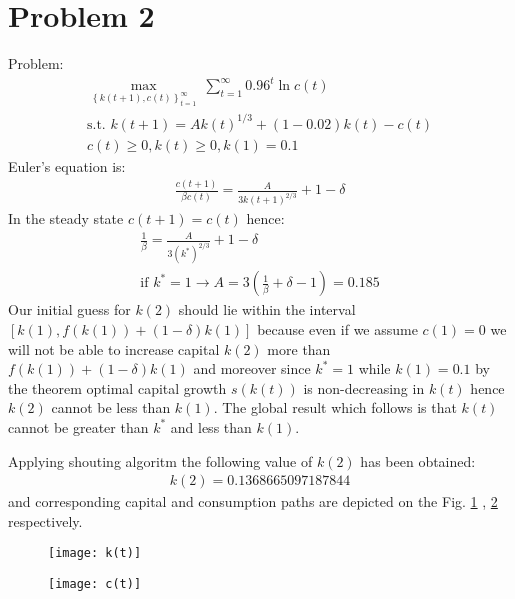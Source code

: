 \documentclass[a4paper]{article}
\begin{document}
\section*{Problem 2}
Problem:
\begin{align*}
\underset{\left\{k(t+1), c(t)\right\}_{t=1}^{\infty}}{\max}\ \sum_{t=1}^{\infty} 0.96^t \ln c(t)\\
\text{s.t.\ } k(t+1) = Ak(t)^{1/3} + (1-0.02)k(t) - c(t)\\
c(t) \ge 0, k(t) \ge 0, k(1) = 0.1
\end{align*}
Euler's equation is:
\begin{align*}
\frac{c(t+1)}{\beta c(t)} = \frac{A}{3k(t+1)^{2/3}} + 1 - \delta
\end{align*}
In the steady state $c(t+1) = c(t)$ hence:
\begin{align*}
\frac{1}{\beta} = \frac{A}{3(k^*)^{2/3}} + 1 - \delta\\
\text{if } k^* = 1 \to A = 3(\frac{1}{\beta} + \delta - 1) = 0.185
\end{align*}
Our initial guess for $k(2)$ should lie within the interval $ [k(1), f(k(1)) + (1 - \delta)k(1)]$ because even if we assume $c(1) = 0$ we will not be able to increase capital $k(2)$ more than $f(k(1)) + (1 - \delta)k(1)$ and moreover since $k^* = 1$ while $k(1) = 0.1$ by the theorem optimal capital growth $s(k(t))$ is non-decreasing in $k(t)$ hence $k(2)$ cannot be less than $k(1)$. The global result which follows is that $k(t)$ cannot be greater than $k^*$ and less than $k(1)$.



Applying shouting algoritm the following value of $k(2)$ has been obtained:
\begin{align*}
k(2) = 0.1368665097187844
\end{align*}
and corresponding capital and consumption paths are depicted on the Fig. \ref{fig1} , \ref{fig2} respectively.
\begin{figure}[h]
	\centering
	\texttt{[image: k(t)]}
	\caption{}\label{fig1}
\end{figure}
\begin{figure}[h]
	\centering
	\texttt{[image: c(t)]}
	\caption{}\label{fig2}
\end{figure}
\end{document}
